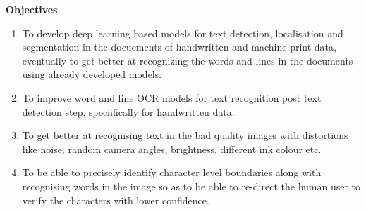 \vspace{10pt}
\vspace{10pt}
{\Large{\textbf{Objectives}}}
\begin{enumerate}
	
	\item To develop deep learning based models for text detection, localisation and segmentation in the docuements of handwritten and  machine print data, eventually to get better at recognizing the words and lines in the documents using already developed models.
	
	\item To improve word and line OCR models for text recognition post text detection step, speciifically for handwritten data.
	
	\item To get better at recognising text in the bad quality images with distortions like noise, random camera angles, brightness, different ink colour etc.
	
	\item To be able to precisely identify character level boundaries along with recognising words in the image so as to be able to re-direct the human user to verify the characters with lower confidence.
	
\end{enumerate}
